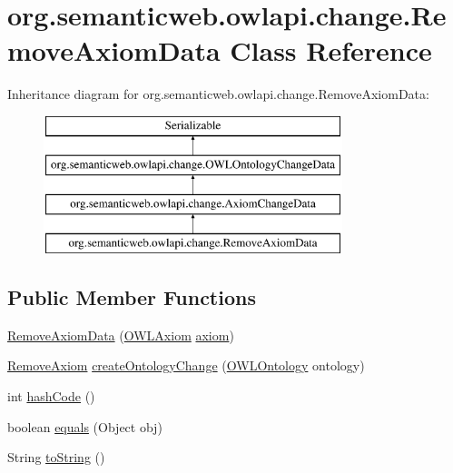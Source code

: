 \hypertarget{classorg_1_1semanticweb_1_1owlapi_1_1change_1_1_remove_axiom_data}{\section{org.\-semanticweb.\-owlapi.\-change.\-Remove\-Axiom\-Data Class Reference}
\label{classorg_1_1semanticweb_1_1owlapi_1_1change_1_1_remove_axiom_data}
}
Inheritance diagram for org.\-semanticweb.\-owlapi.\-change.\-Remove\-Axiom\-Data\-:\begin{figure}[H]
\begin{center}
\leavevmode
\includegraphics[height=4.000000cm]{classorg_1_1semanticweb_1_1owlapi_1_1change_1_1_remove_axiom_data}
\end{center}
\end{figure}
\subsection*{Public Member Functions}
\begin{DoxyCompactItemize}
\item 
\hyperlink{classorg_1_1semanticweb_1_1owlapi_1_1change_1_1_remove_axiom_data_a3c7aaf6b66b677e9557d9390f3d71c0f}{Remove\-Axiom\-Data} (\hyperlink{interfaceorg_1_1semanticweb_1_1owlapi_1_1model_1_1_o_w_l_axiom}{O\-W\-L\-Axiom} \hyperlink{classorg_1_1semanticweb_1_1owlapi_1_1change_1_1_axiom_change_data_acecb42f3fae836ede3fc37f8c4feb4e4}{axiom})
\item 
\hyperlink{classorg_1_1semanticweb_1_1owlapi_1_1model_1_1_remove_axiom}{Remove\-Axiom} \hyperlink{classorg_1_1semanticweb_1_1owlapi_1_1change_1_1_remove_axiom_data_abca7c3b473cae93966a051f4fa3e6d75}{create\-Ontology\-Change} (\hyperlink{interfaceorg_1_1semanticweb_1_1owlapi_1_1model_1_1_o_w_l_ontology}{O\-W\-L\-Ontology} ontology)
\item 
int \hyperlink{classorg_1_1semanticweb_1_1owlapi_1_1change_1_1_remove_axiom_data_ad79fac36f4f84def5318bd97663a12ca}{hash\-Code} ()
\item 
boolean \hyperlink{classorg_1_1semanticweb_1_1owlapi_1_1change_1_1_remove_axiom_data_ac30ec9648d603a1dfe8f43f834f66277}{equals} (Object obj)
\item 
String \hyperlink{classorg_1_1semanticweb_1_1owlapi_1_1change_1_1_remove_axiom_data_a37fbae0942859055452ae3d1f18dcf56}{to\-String} ()
\end{DoxyCompactItemize}
